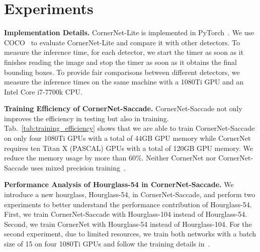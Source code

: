 \documentclass{bmvc2k}
\begin{document}
\section{Experiments}
\smallskip \noindent \textbf{Implementation Details.} CornerNet-Lite is implemented in PyTorch~\cite{paszke2017automatic}. We use COCO~\cite{lin2014microsoft} to evaluate CornerNet-Lite and compare it with other detectors. To measure the inference time, for each detector, we start the timer as soon as it finishes reading the image and stop the timer as soon as it obtains the final bounding boxes. To provide fair comparisons between different detectors, we measure the inference times on the same machine with a 1080Ti GPU and an Intel Core i7-7700k CPU.

\begin{table}[h]
    \centering
    \caption{CornerNet-Saccade saves more than 60\% GPU memory and requires only 4 GPUs to train, while it outperforms CornerNet.}
    \label{tab:training_efficiency}
    \vspace{-3mm}
\end{table}

\smallskip \noindent \textbf{Training Efficiency of CornerNet-Saccade.} CornerNet-Saccade not only improves the efficiency in testing but also in training. Tab.~\ref{tab:training_efficiency} shows that we are able to train CornerNet-Saccade on only four 1080Ti GPUs with a total of 44GB GPU memory while CornerNet requires ten Titan X (PASCAL) GPUs with a total of 120GB GPU memory. We reduce the memory usage by more than 60\%. Neither CornerNet nor CornerNet-Saccade uses mixed precision training~\cite{micikevicius2017mixed}.

\smallskip \noindent \textbf{Performance Analysis of Hourglass-54 in CornerNet-Saccade.} We introduce a new hourglass, Hourglass-54, in CornerNet-Saccade, and perform two experiments to better understand the performance contribution of Hourglass-54. First, we train CornerNet-Saccade with Hourglass-104 instead of Hourglass-54. Second, we train CornerNet with Hourglass-54 instead of Hourglass-104. For the second experiment, due to limited resources, we train both networks with a batch size of 15 on four 1080Ti GPUs and follow the training details in~\cite{law2018cornernet}. 
\end{document}
